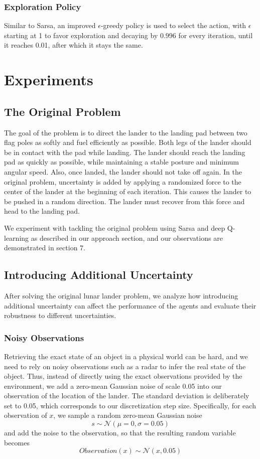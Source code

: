 \documentclass[10pt, conference]{IEEEtran}
\begin{document}
\subsubsection{Exploration Policy}
Similar to Sarsa, an improved $\epsilon$-greedy policy is used to select the action, with $\epsilon$ starting at 1 to favor exploration and decaying by $0.996$ for every iteration, until it reaches 0.01, after which it stays the same.

\section{Experiments}
\subsection{The Original Problem}
The goal of the problem is to direct the lander to the landing pad between two flag poles as softly and fuel efficiently as possible. Both legs of the lander should be in contact with the pad while landing. The lander should reach the landing pad as quickly as possible, while maintaining a stable posture and minimum angular speed. Also, once landed, the lander should not take off again. In the original problem, uncertainty is added by applying a randomized force to the center of the lander at the beginning of each iteration. This causes the lander to be pushed in a random direction. The lander must recover from this force and head to the landing pad.

We experiment with tackling the original problem using Sarsa and deep Q-learning as described in our approach section, and our observations are demonstrated in section $7$.

\subsection{Introducing Additional Uncertainty}
After solving the original lunar lander problem, we analyze how introducing additional uncertainty can affect the performance of the agents and evaluate their robustness to different uncertainties.
\subsubsection{Noisy Observations}
Retrieving the exact state of an object in a physical world can be hard, and we need to rely on noisy observations such as a radar to infer the real state of the object. Thus, instead of directly using the exact observations provided by the environment, we add a zero-mean Gaussian noise of scale 0.05 into our observation of the location of the lander. The standard deviation is deliberately set to 0.05, which corresponds to our discretization step size. Specifically, for each observation of $x$, we sample a random zero-mean Gaussian noise
\begin{equation}
    s \sim \mathcal{N}(\mu = 0, \sigma = 0.05)
\end{equation}
and add the noise to the observation, so that the resulting random variable becomes
\begin{equation}
    Observation(x) \sim \mathcal{N}(x, 0.05)
\end{equation}
\end{document}
